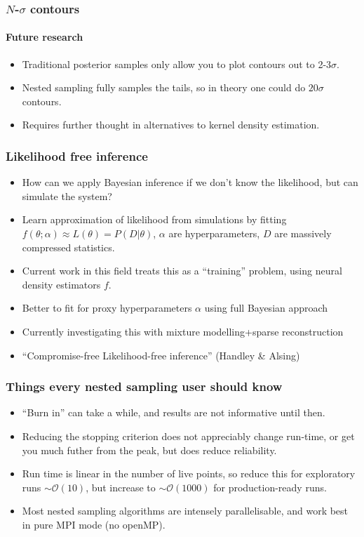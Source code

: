 \documentclass[%
]{beamer}
\begin{document}
\begin{frame}
    \frametitle{$N$-$\sigma$ contours}
    \framesubtitle{Future research}
    \begin{itemize}
        \item Traditional posterior samples only allow you to plot contours out to 2-3$\sigma$.
        \item Nested sampling fully samples the tails, so in theory one could do $20\sigma$ contours.
        \item Requires further thought in alternatives to kernel density estimation.
    \end{itemize}
\end{frame}

\begin{frame}
    \frametitle{Likelihood free inference}
    \begin{itemize}
        \item How can we apply Bayesian inference if we don't know the likelihood, but can simulate the system?
        \item Learn approximation of likelihood from simulations by fitting $f(\theta;\alpha)\approx L(\theta) =P(D|\theta)$, $\alpha$ are hyperparameters, $D$ are massively compressed statistics.
        \item Current work in this field treats this as a ``training'' problem, using neural density estimators $f$.
        \item Better to fit for proxy hyperparameters $\alpha$ using full Bayesian approach 
        \item Currently investigating this with mixture modelling+sparse reconstruction
        \item ``Compromise-free Likelihood-free inference'' (Handley \& Alsing)
    \end{itemize}
\end{frame}


\begin{frame}
    \frametitle{Things every nested sampling user should know}
        \begin{itemize}
            \item ``Burn in'' can take a while, and results are not informative until then.
            \item Reducing the stopping criterion does not appreciably change run-time, or get you much futher from the peak, but does reduce reliability.
            \item Run time is linear in the number of live points, so reduce this for exploratory runs $\sim\mathcal{O}(10)$, but increase to $\sim\mathcal{O}(1000)$ for production-ready runs.
            \item Most nested sampling algorithms are intensely parallelisable, and work best in pure MPI mode (no openMP).
        \end{itemize}
\end{frame}
\end{document}
